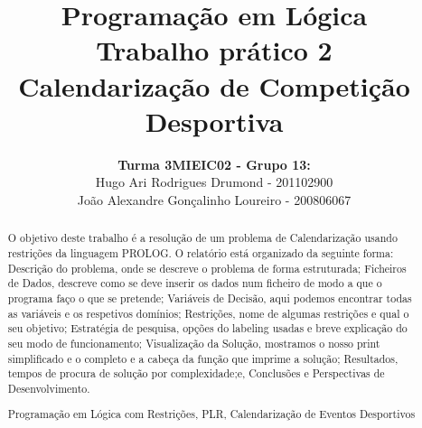 \documentclass[runningheads,a4paper]{llncs}
\newcommand{\keywords}[1]{\par\addvspace\baselineskip
\noindent\keywordname\enspace\ignorespaces#1}
\begin{document}
\mainmatter

\title{Programação em Lógica\\Trabalho prático 2\\Calendarização de Competição Desportiva \linebreak}


\author{\textbf{Turma 3MIEIC02 - Grupo 13:}\\ Hugo Ari Rodrigues Drumond - 201102900 \\ João Alexandre Gonçalinho Loureiro - 200806067 \linebreak}



\maketitle

\begin{abstract}
O objetivo deste trabalho é a resolução de um problema de Calendarização usando restrições da linguagem PROLOG. O relatório está organizado da seguinte forma: Descrição do problema, onde se descreve o problema de forma estruturada; Ficheiros de Dados, descreve como se deve inserir os dados num ficheiro de modo a que o programa faço o que se pretende; Variáveis de Decisão, aqui podemos encontrar todas as variáveis e os respetivos domínios; Restrições, nome de algumas restrições e qual o seu objetivo; Estratégia de pesquisa, opções do labeling usadas e breve explicação do seu modo de funcionamento; Visualização da Solução, mostramos o nosso print simplificado e o completo e a cabeça da função que imprime a solução; Resultados, tempos de procura de solução por complexidade;e, Conclusões e Perspectivas de Desenvolvimento.
\keywords{Programação em Lógica com Restrições, PLR, Calendarização de Eventos Desportivos}
\end{abstract}
\newpage
\end{document}
